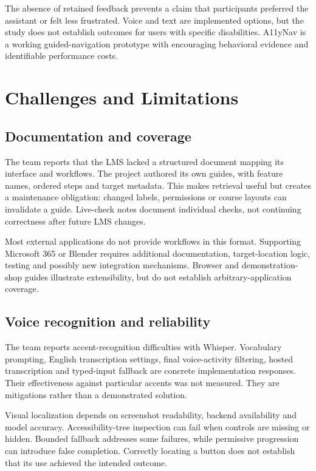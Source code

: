 \documentclass[11pt,a4paper]{article}
\begin{document}
The absence of retained feedback prevents a claim that participants preferred the assistant or felt less frustrated. Voice and text are implemented options, but the study does not establish outcomes for users with specific disabilities. A11yNav is a working guided-navigation prototype with encouraging behavioral evidence and identifiable performance costs.

\section{Challenges and Limitations}
\subsection{Documentation and coverage}
The team reports that the LMS lacked a structured document mapping its interface and workflows. The project authored its own guides, with feature names, ordered steps and target metadata. This makes retrieval useful but creates a maintenance obligation: changed labels, permissions or course layouts can invalidate a guide. Live-check notes document individual checks, not continuing correctness after future LMS changes.

Most external applications do not provide workflows in this format. Supporting Microsoft 365 or Blender requires additional documentation, target-location logic, testing and possibly new integration mechanisms. Browser and demonstration-shop guides illustrate extensibility, but do not establish arbitrary-application coverage.

\subsection{Voice recognition and reliability}
The team reports accent-recognition difficulties with Whisper. Vocabulary prompting, English transcription settings, final voice-activity filtering, hosted transcription and typed-input fallback are concrete implementation responses. Their effectiveness against particular accents was not measured. They are mitigations rather than a demonstrated solution.

Visual localization depends on screenshot readability, backend availability and model accuracy. Accessibility-tree inspection can fail when controls are missing or hidden. Bounded fallback addresses some failures, while permissive progression can introduce false completion. Correctly locating a button does not establish that its use achieved the intended outcome.
\end{document}
